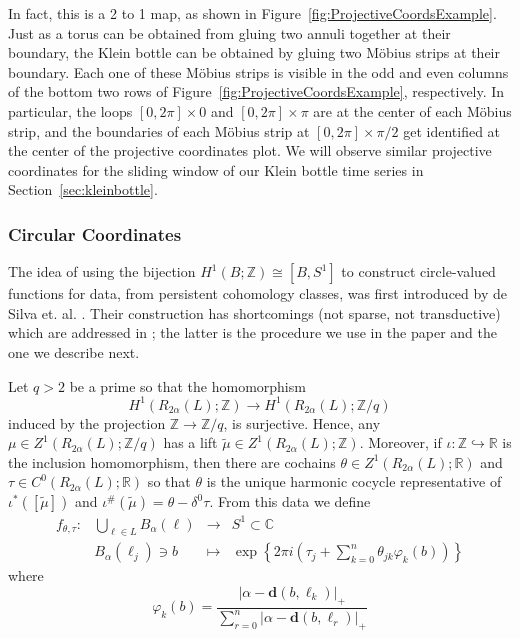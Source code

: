 \documentclass[11pt]{article}
\theoremstyle{definition}
\theoremstyle{remark}
\newcommand{\RR}{\mathbb{R}}
\newcommand{\CC}{\mathbb{C}}
\newcommand{\ZZ}{\mathbb{Z}}
\begin{document}
    In fact, this is a 2 to 1 map, as shown in Figure~\ref{fig:ProjectiveCoordsExample}.  Just as a torus can be obtained from gluing two annuli together at their boundary, the Klein bottle can be obtained by gluing two M{\"o}bius strips at their boundary.  Each one of these M{\"o}bius strips is visible in the odd and even columns of the bottom two rows of Figure~\ref{fig:ProjectiveCoordsExample}, respectively.  In particular, the loops $[0, 2 \pi] \times 0$ and $[0, 2 \pi] \times \pi$ are at the center of each M{\"o}bius strip, and the boundaries of each M{\"o}bius strip at $[0, 2 \pi] \times \pi/2$ get identified at the center of the projective coordinates plot.  We will observe similar projective coordinates for the sliding window of our Klein bottle time series in Section~\ref{sec:kleinbottle}.

    \subsubsection{Circular Coordinates}

    The idea of using the bijection
    $H^1(B;\ZZ) \cong [B , S^1]$ to construct circle-valued functions
    for data, from persistent cohomology classes,
    was first introduced by de Silva et. al. \cite{de2011persistent}.
    Their construction has shortcomings (not sparse, not transductive)
    which are addressed in \cite{perea2018circular};
    the latter is the procedure we use in the paper
    and the one we describe next.

    Let $q>2$ be a prime so that the homomorphism
    \[H^1(R_{2\alpha}(L) ;\ZZ) \longrightarrow H^1(R_{2\alpha}(L);\ZZ/q)\]
    induced by the projection $\ZZ \longrightarrow \ZZ/q$,
    is surjective.
    Hence, any
    $\mu\in Z^1(R_{2\alpha}(L);\ZZ/q)$
     has a lift 
    $\tilde{\mu}\in Z^1(R_{2\alpha}(L);\ZZ)$.
     Moreover, if $\iota : \ZZ \hookrightarrow \RR $
    is the inclusion homomorphism, then
    there are cochains
    $\theta \in Z^1(R_{2\alpha}(L);  \RR)$
    and $\tau \in C^0(R_{2\alpha}(L) ; \RR)$
    so that
    $\theta$ is the unique harmonic cocycle
    representative of $\iota^*([\tilde{\mu}])$ and
    $\iota^\#(\tilde{\mu}) = \theta - \delta^0\tau$. From this data we define
    \[
    \begin{array}{cccl}
      f_{\theta,\tau} : & \bigcup\limits_{\ell \in L} B_\alpha(\ell)  & \longrightarrow  & S^1\subset \CC \\
       & B_{\alpha}(\ell_j) \ni b & \mapsto &
       \exp
       \left\{
       2\pi i
       \left(
       \tau_j + \sum\limits_{k=0}^n \theta_{jk}\varphi_k (b)
       \right)
       \right\}
    \end{array}
    \]
    where
    \[
    \varphi_k (b)= \frac{|\alpha - \mathbf{d}(b,\ell_k)|_{+}}
    {\sum\limits_{r=0}^n |\alpha - \mathbf{d}(b,\ell_r)|_{+}}
    \]
\end{document}
